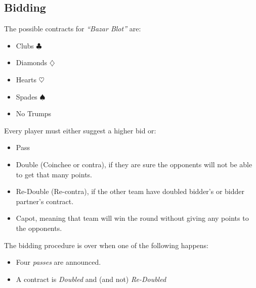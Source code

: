 \subsection{Bidding}
The possible contracts for \textit{``Bazar Blot''} are:
\begin{itemize}
    \item Clubs $\clubsuit$
    \item Diamonds $\diamondsuit$
    \item Hearts $\heartsuit$
    \item Spades $\spadesuit$
    \item No Trumps
\end{itemize}
Every player must either suggest a higher bid or:
\begin{itemize}
    \item Pass
    \item Double (Coinchee or contra), if they are sure the opponents will not be able to get that many points.
    \item Re-Double (Re-contra), if the other team have doubled bidder's or bidder partner's contract.
    \item Capot, meaning that team will win the round without giving any points to the opponents.
\end{itemize}

The bidding procedure is over when one of the following happens:
\begin{itemize}
    \item Four \textit{passes} are announced.
    \item A contract is \textit{Doubled} and (and not) \textit{Re-Doubled}
\end{itemize}

